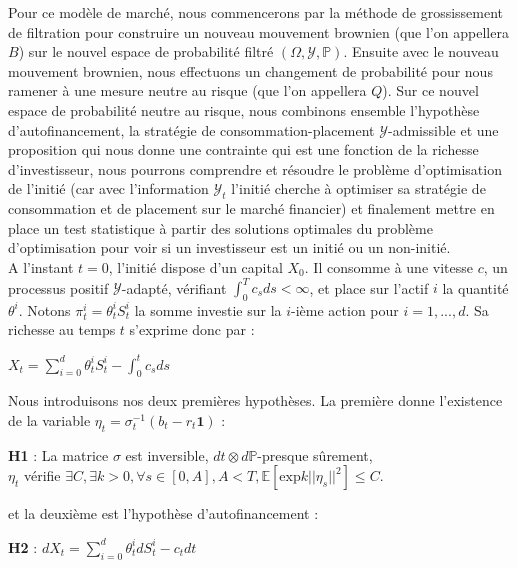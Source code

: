 Pour ce modèle de marché, nous commencerons par la méthode de grossissement de filtration pour construire un nouveau mouvement brownien (que l'on appellera $B$) sur le nouvel espace de probabilité filtré $(\Omega, \mathcal{Y}, \mathbb{P})$. Ensuite avec le nouveau mouvement brownien, nous effectuons un changement de probabilité pour nous ramener à une mesure neutre au risque (que l'on appellera $Q$). Sur ce nouvel espace de probabilité neutre au risque, nous combinons ensemble l'hypothèse d'autofinancement, la stratégie de consommation-placement $\mathcal{Y}$-admissible et une proposition qui nous donne une contrainte qui est une fonction de la richesse d'investisseur, nous pourrons comprendre et résoudre le problème d'optimisation de l'initié (car avec l'information $\mathcal{Y}_t$ l'initié cherche à optimiser sa stratégie de consommation et de placement sur le marché financier) et finalement mettre en place un test statistique à partir des solutions optimales du problème d'optimisation pour voir si un investisseur est un initié ou un non-initié. \\

A l'instant $t=0$, l'initié dispose d'un capital $X_0$. Il consomme à une vitesse $c$, un processus positif $\mathcal{Y}$-adapté, vérifiant $\int_{0}^{T} c_s ds < \infty$, et place sur l'actif $i$ la quantité $\theta^i$. Notons $\pi_t^i = \theta^i_t S_t^i$ la somme investie sur la $i$-ième action pour $i =1, ..., d$. Sa richesse au temps $t$ s'exprime donc par : 
\begin{center}
$X_t = \displaystyle \sum_{i=0}^{d} \theta^i_t S_t^i - \int_{0}^{t} c_s ds$
\end{center}


Nous introduisons nos deux premières hypothèses. La première donne l'existence de la variable $\eta_t = \sigma_t^{-1}(b_t - r_t \textbf{1})$ : 
\begin{center}
\textbf{H1} : La matrice $\sigma$ est inversible, $dt \otimes d\mathbb{P}$-presque sûrement, \\
$\eta_t$ vérifie $\exists C, \exists k > 0, \forall s \in [0, A], A < T, \mathbb{E}[\text{exp}k||\eta_s||^2] \leq C$.\\
\end{center}

et la deuxième est l'hypothèse d'autofinancement :
\begin{center}
\textbf{H2} : $dX_t = \displaystyle \sum_{i=0}^{d} \theta^i_t dS_t^i - c_t dt$
\end{center}

